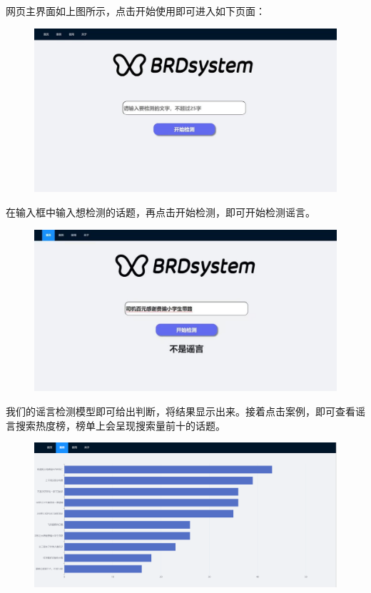 \documentclass{article}
\begin{document}
网页主界面如上图所示，点击开始使用即可进入如下页面：

\begin{figure}[H]
    \centering
    \includegraphics[scale=0.8]{pircture/查询界面.jpg}
\end{figure}

在输入框中输入想检测的话题，再点击开始检测，即可开始检测谣言。

\begin{figure}[H]
    \centering
    \includegraphics[scale=0.8]{pircture/结果界面.jpg}
\end{figure}

我们的谣言检测模型即可给出判断，将结果显示出来。接着点击案例，即可查看谣言搜索热度榜，榜单上会呈现搜索量前十的话题。

\begin{figure}[H]
    \centering
    \includegraphics[scale=0.1]{pircture/热度榜界面.png}
\end{figure}
\end{document}
